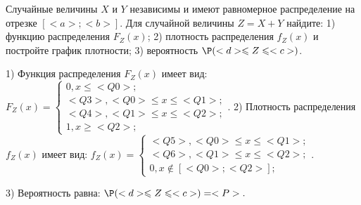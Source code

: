\documentclass{article}%
\begin{document}
\begin{problem}
Случайные величины $X$ и $Y$ независимы и имеют равномерное
распределение на отрезке $[<a>;<b>]$. Для случайной величины $Z=X+Y$ найдите:
1) функцию распределения $F_Z(x)$;
2) плотность распределения $f_Z(x)$ и постройте график плотности;
3) вероятность $\P(<d>\leqslant Z\leqslant<c>)$.
\end{problem}

\begin{solution*}
1) Функция распределения $F_Z(x)$ имеет вид:
$
F_Z(x)=\left\{
\begin{array}{l}
0, x\leqslant <Q0>;\\
<Q3>, <Q0>\leqslant x\leqslant <Q1>;\\
<Q4>, <Q1>\leqslant x\leqslant <Q2>;\\
1, x\geqslant <Q2>;
\end{array}.
\right.
$
2) Плотность распределения $f_Z(x)$ имеет вид:
$
f_Z(x)=\left\{
\begin{array}{l}
<Q5>, <Q0>\leqslant x\leqslant <Q1>;\\
<Q6>, <Q1>\leqslant x\leqslant <Q2>;\\
0, x\not\in [<Q0>;<Q2>];
\end{array}.
\right.
$

3) Вероятность равна:
$
\P(<d>\leqslant Z\leqslant<c>)=<P>.
$
\end{solution*}
\end{document}
